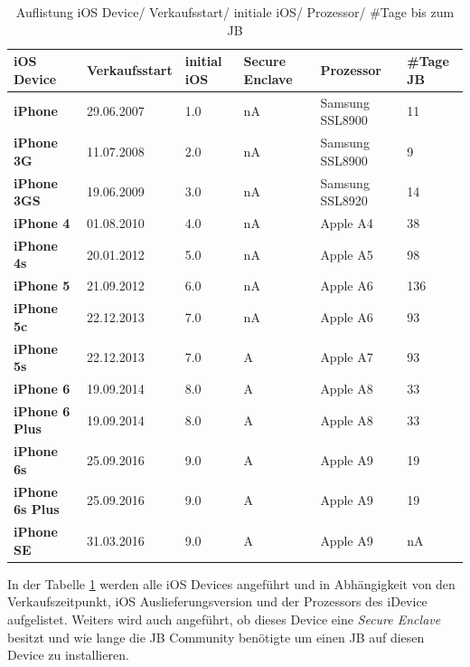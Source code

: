 \begin{table}[htp!]
    \begin{center}
        \begin{tabular}{|p{30mm}|p{27mm}|p{12mm}|p{18mm}|p{2cm}|p{22mm}|} \hline
            \textbf{iOS Device} & \textbf{Verkaufsstart} & \textbf{initial iOS} & \textbf{Secure Enclave} & \textbf{Prozessor}  & \textbf{\#Tage JB} \\ \hline
            \textbf{iPhone} & 29.06.2007  & 1.0 & nA & Samsung SSL8900 & 11\\ \hline
            \textbf{iPhone 3G} & 11.07.2008 & 2.0 & nA & Samsung SSL8900 & 9\\ \hline
            \textbf{iPhone 3GS} & 19.06.2009 & 3.0 & nA & Samsung SSL8920 & 14\\ \hline
            \textbf{iPhone 4} & 01.08.2010 & 4.0 & nA & Apple A4 & 38 \\ \hline
            \textbf{iPhone 4s} & 20.01.2012 & 5.0 & nA & Apple A5 & 98 \\ \hline 
            \textbf{iPhone 5} & 21.09.2012 & 6.0 & nA & Apple A6 & 136 \\ \hline
            \textbf{iPhone 5c} & 22.12.2013 & 7.0 & nA & Apple A6 & 93 \\ \hline
            \textbf{iPhone 5s} & 22.12.2013 & 7.0 & A & Apple A7 & 93 \\ \hline
            \textbf{iPhone 6} & 19.09.2014 & 8.0 & A & Apple A8 & 33\\ \hline
            \textbf{iPhone 6 Plus} & 19.09.2014 & 8.0 & A & Apple A8 & 33\\ \hline
            \textbf{iPhone 6s} & 25.09.2016 & 9.0 & A & Apple A9 & 19\\ \hline
            \textbf{iPhone 6s Plus} & 25.09.2016 & 9.0 & A & Apple A9 & 19\\ \hline
            \textbf{iPhone SE} & 31.03.2016 & 9.0 & A & Apple A9 & nA\\ \hline  
        \end{tabular} 
        \caption{Auflistung iOS Device/ Verkaufsstart/ initiale iOS/ Prozessor/ \#Tage bis zum JB}
        \label{tab:iOSHW}
    \end{center}
\end{table}
In der Tabelle \ref{tab:iOSHW} werden alle iOS Devices angeführt und in Abhängigkeit von den Verkaufszeitpunkt, iOS Auslieferungsversion und der Prozessors des iDevice aufgelistet. Weiters wird auch angeführt, ob dieses Device eine \textit{\glqq Secure Enclave\grqq{}} besitzt und wie lange die JB Community benötigte um einen JB auf diesen Device zu installieren.\par

